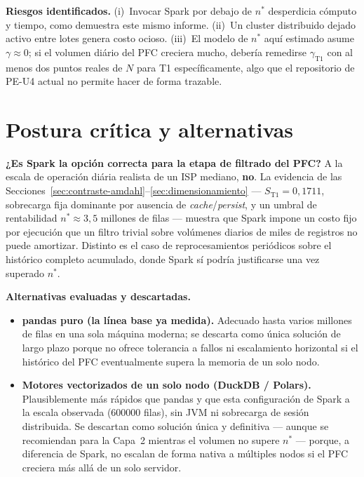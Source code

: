 \documentclass[11pt,a4paper]{article}
\begin{document}
\textbf{Riesgos identificados.} (i)~Invocar Spark por debajo de $n^{*}$ desperdicia c\'omputo y
tiempo, como demuestra este mismo informe. (ii)~Un cluster distribuido dejado activo entre
lotes genera costo ocioso. (iii)~El modelo de $n^{*}$ aqu\'i estimado asume $\gamma\approx 0$;
si el volumen di\'ario del PFC creciera mucho, deber\'ia remedirse $\gamma_{\text{T1}}$ con al
menos dos puntos reales de $N$ para T1 espec\'ificamente, algo que el repositorio de PE-U4
actual no permite hacer de forma trazable.

\section{Postura cr\'itica y alternativas}
\label{sec:critica}

\textbf{¿Es Spark la opci\'on correcta para la etapa de filtrado del PFC?} A la escala de
operaci\'on di\'aria realista de un ISP mediano, \textbf{no}. La evidencia de las
Secciones~\ref{sec:contraste-amdahl}--\ref{sec:dimensionamiento} --- $S_{\text{T1}}=0{,}1711$,
sobrecarga fija dominante por ausencia de \textit{cache}/\textit{persist}, y un umbral de
rentabilidad $n^{*}\approx 3{,}5$ millones de filas --- muestra que Spark impone un costo fijo
por ejecuci\'on que un filtro trivial sobre volúmenes diarios de miles de registros no puede
amortizar. Distinto es el caso de reprocesamientos peri\'odicos sobre el hist\'orico completo
acumulado, donde Spark s\'i podr\'ia justificarse una vez superado $n^{*}$.

\textbf{Alternativas evaluadas y descartadas.}
\begin{itemize}
  \item \textbf{pandas puro (la l\'inea base ya medida).} Adecuado hasta varios millones de
  filas en una sola m\'aquina moderna; se descarta como \'unica soluci\'on de largo plazo
  porque no ofrece tolerancia a fallos ni escalamiento horizontal si el hist\'orico del PFC
  eventualmente supera la memoria de un solo nodo.
  \item \textbf{Motores vectorizados de un solo nodo (DuckDB / Polars).} Plausiblemente m\'as
  r\'apidos que pandas y que esta configuraci\'on de Spark a la escala observada
  (\num{600000} filas), sin JVM ni sobrecarga de sesi\'on distribuida. Se descartan como
  soluci\'on \'unica y definitiva --- aunque se recomiendan para la Capa~2 mientras el volumen
  no supere $n^{*}$ --- porque, a diferencia de Spark, no escalan de forma nativa a m\'ultiples
  nodos si el PFC creciera m\'as all\'a de un solo servidor.
\end{itemize}
\end{document}
